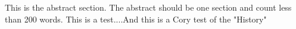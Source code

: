This is the abstract section. The abstract should be one section and count less than 200 words. This is a test....And this is a Cory test of the "History"